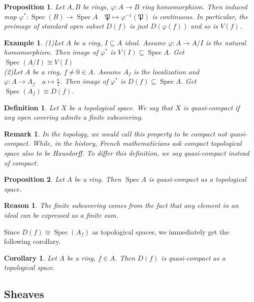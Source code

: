 \documentclass{ctexart}
\newtheorem{definition}{Definition}[section]
\newtheorem{remark}{Remark}[section]
\newtheorem{proposition}{Proposition}[section]
\newtheorem{reason}{Reason}[section]
\newtheorem{example}{Example}[section]
\newtheorem{corollary}{Corollary}[section]
\newcommand{\spec}{\operatorname{Spec}}
\begin{document}
\begin{proposition}
    Let $A, B$ be rings, $\varphi: A \longrightarrow B$ ring homomorphism.
    Then induced map $\varphi^{\ast}: \spec(B) \longrightarrow \spec A\quad \mathfrak{P} \longmapsto \varphi^{-1}(\mathfrak{P})$ is continuous.
    In particular, the preimage of standard open subset $D(f)$ is just $D(\varphi(f))$ and so is $V(f)$.
    \label{Proposition 1.3}
\end{proposition}
\begin{example}
    (1)Let $A$ be a ring, $I \subseteq A$ ideal.
    Assume $\varphi: A \longrightarrow A/I$ is the natural homomorphism.
    Then image of $\varphi^{\ast}$ is $V(I) \subseteq \spec A$.
    Get $\spec(A/I) \cong V(I)$ \\
    (2)Let $A$ be a ring, $f \neq 0\in A$.
    Assume $A_{f}$ is the localization and $\varphi: A \longrightarrow A_{f}\quad a \longmapsto \frac{a}{1}$.
    Then image of $\varphi^{\ast}$ is $D(f) \subseteq \spec A$.
    Get $\spec(A_{f}) \cong D(f)$.
\end{example}
\begin{definition}
    Let $X$ be a topological space.
    We say that $X$ is quasi-compact if any open covering admits a finite subcovering.
\end{definition}
\begin{remark}
    In the topology, we would call this property to be compact not quasi-compact.
    While, in the history, French mathematicians ask compact topological space also to be Hausdorff.
    To differ this definition, we say quasi-compact instead of compact.
\end{remark}
\begin{proposition}
    Let $A$ be a ring.
    Then $\spec A$ is quasi-compact as a topological space.
    \label{Proposition 1.4}
\end{proposition}
\begin{reason}
    The finite subcovering comes from the fact that any element in an ideal can be expressed as a finite sum.
\end{reason}
Since $D(f) \cong \spec(A_{f})$ as topological spaces, we immediately get the following corollary.
\begin{corollary}
    Let $A$ be a ring, $f\in A$.
    Then $D(f)$ is quasi-compact as a topological space.
    \label{Corollary 1.1}
\end{corollary}

\subsection{Sheaves}
\label{subsection:Schemes_Sheaves}
\end{document}

